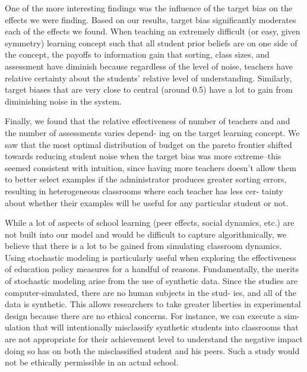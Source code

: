 \documentclass[10pt, letterpaper]{article}
\begin{document}
One of the more interesting findings was the influence of the target
bias on the effects we were finding. Based on our results, target bias
significantly moderates each of the effects we found. When teaching an
extremely difficult (or easy, given symmetry) learning concept such that
all student prior beliefs are on one side of the concept, the payoffs to
information gain that sorting, class sizes, and assessment have diminish
because regardless of the level of noise, teachers have relative
certainty about the students' relative level of understanding.
Similarly, target biases that are very close to central (around 0.5)
have a lot to gain from diminishing noise in the system.

Finally, we found that the relative effectiveness of number of teachers
and and the number of assessments varies depend- ing on the target
learning concept. We saw that the most optimal distribution of budget on
the pareto frontier shifted towards reducing student noise when the
target bias was more extreme--this seemed consistent with intuition,
since having more teachers doesn't allow them to better select examples
if the administrator produces greater sorting errors, resulting in
heterogeneous classrooms where each teacher has less cer- tainty about
whether their examples will be useful for any particular student or not.

While a lot of aspects of school learning (peer effects, social
dynamics, etc.) are not built into our model and would be difficult to
capture algorithmically, we believe that there is a lot to be gained
from simulating classroom dynamics. Using stochastic modeling is
particularly useful when exploring the effectiveness of education policy
measures for a handful of reasons. Fundamentally, the merits of
stochastic modeling arise from the use of synthetic data. Since the
studies are computer-simulated, there are no human subjects in the stud-
ies, and all of the data is synthetic. This allows researchers to take
greater liberties in experimental design because there are no ethical
concerns. For instance, we can execute a sim- ulation that will
intentionally misclassify synthetic students into classrooms that are
not appropriate for their achievement level to understand the negative
impact doing so has on both the misclassified student and his peers.
Such a study would not be ethically permissible in an actual school.
\end{document}
